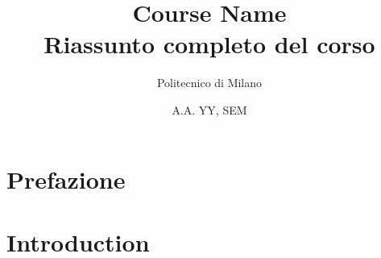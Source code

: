 \documentclass[11pt,a4paper]{article}
\title{\textbf{Course Name}\\
\large Riassunto completo del corso}
\author{Politecnico di Milano}
\date{A.A. YY, SEM}
\newcommand{\folder}{Chapters/} %
\begin{document}
\maketitle
\tableofcontents
\newpage

\section{Prefazione}


\section{Introduction}

\end{document}
